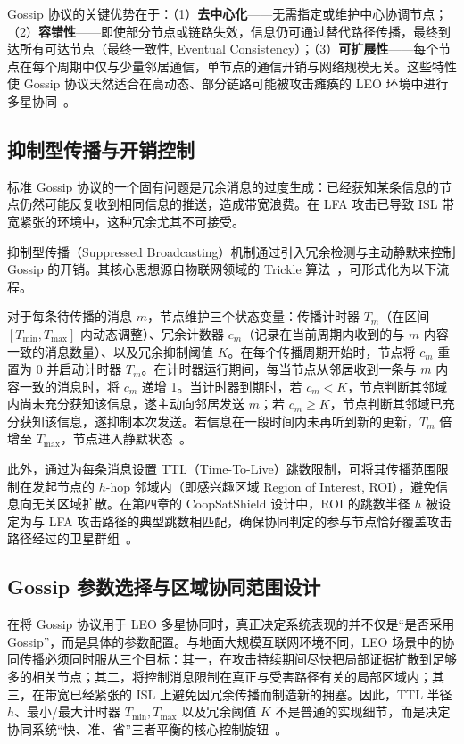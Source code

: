 Gossip 协议的关键优势在于：（1）\textbf{去中心化}——无需指定或维护中心协调节点；（2）\textbf{容错性}——即使部分节点或链路失效，信息仍可通过替代路径传播，最终到达所有可达节点（最终一致性, Eventual Consistency）；（3）\textbf{可扩展性}——每个节点在每个周期中仅与少量邻居通信，单节点的通信开销与网络规模无关。这些特性使 Gossip 协议天然适合在高动态、部分链路可能被攻击瘫痪的 LEO 环境中进行多星协同~\cite{demers1987epidemic}。

\subsection{抑制型传播与开销控制}

标准 Gossip 协议的一个固有问题是冗余消息的过度生成：已经获知某条信息的节点仍然可能反复收到相同信息的推送，造成带宽浪费。在 LFA 攻击已导致 ISL 带宽紧张的环境中，这种冗余尤其不可接受。

抑制型传播（Suppressed Broadcasting）机制通过引入冗余检测与主动静默来控制 Gossip 的开销。其核心思想源自物联网领域的 Trickle 算法~\cite{levis2004trickle}，可形式化为以下流程。

对于每条待传播的消息 $m$，节点维护三个状态变量：传播计时器 $T_m$（在区间 $[T_{\min}, T_{\max}]$ 内动态调整）、冗余计数器 $c_m$（记录在当前周期内收到的与 $m$ 内容一致的消息数量）、以及冗余抑制阈值 $K$。在每个传播周期开始时，节点将 $c_m$ 重置为 0 并启动计时器 $T_m$。在计时器运行期间，每当节点从邻居收到一条与 $m$ 内容一致的消息时，将 $c_m$ 递增 1。当计时器到期时，若 $c_m < K$，节点判断其邻域内尚未充分获知该信息，遂主动向邻居发送 $m$；若 $c_m \geq K$，节点判断其邻域已充分获知该信息，遂抑制本次发送。若信息在一段时间内未再听到新的更新，$T_m$ 倍增至 $T_{\max}$，节点进入静默状态~\cite{levis2004trickle}。

此外，通过为每条消息设置 TTL（Time-To-Live）跳数限制，可将其传播范围限制在发起节点的 $h$-hop 邻域内（即感兴趣区域 Region of Interest, ROI），避免信息向无关区域扩散。在第四章的 CoopSatShield 设计中，ROI 的跳数半径 $h$ 被设定为与 LFA 攻击路径的典型跳数相匹配，确保协同判定的参与节点恰好覆盖攻击路径经过的卫星群组~\cite{satshield}。


\subsection{Gossip 参数选择与区域协同范围设计}

在将 Gossip 协议用于 LEO 多星协同时，真正决定系统表现的并不仅是“是否采用 Gossip”，而是具体的参数配置。与地面大规模互联网环境不同，LEO 场景中的协同传播必须同时服从三个目标：其一，在攻击持续期间尽快把局部证据扩散到足够多的相关节点；其二，将控制消息限制在真正与受害路径有关的局部区域内；其三，在带宽已经紧张的 ISL 上避免因冗余传播而制造新的拥塞。因此，TTL 半径 $h$、最小/最大计时器 $T_{\min},T_{\max}$ 以及冗余阈值 $K$ 不是普通的实现细节，而是决定协同系统“快、准、省”三者平衡的核心控制旋钮~\cite{demers1987epidemic, levis2004trickle}。

